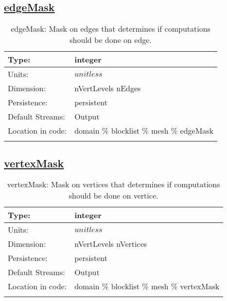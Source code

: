 \subsection[edgeMask]{\hyperref[sec:var_tab_mesh]{edgeMask}}
\label{subsec:var_sec_mesh_edgeMask}
\begin{center}
\begin{longtable}{| p{2.0in} | p{4.0in} |}
        \hline 
        Type: & integer \\
        \hline 
        Units: & $unitless$ \\
        \hline 
        Dimension: & nVertLevels nEdges \\
        \hline 
        Persistence: & persistent \\
        \hline 
		 Default Streams: & Output  \\
        \hline 
		 Location in code: & domain \% blocklist \% mesh \% edgeMask \\
		 \hline 
    \caption{edgeMask: Mask on edges that determines if computations should be done on edge.}
\end{longtable}
\end{center}
\subsection[vertexMask]{\hyperref[sec:var_tab_mesh]{vertexMask}}
\label{subsec:var_sec_mesh_vertexMask}
\begin{center}
\begin{longtable}{| p{2.0in} | p{4.0in} |}
        \hline 
        Type: & integer \\
        \hline 
        Units: & $unitless$ \\
        \hline 
        Dimension: & nVertLevels nVertices \\
        \hline 
        Persistence: & persistent \\
        \hline 
		 Default Streams: & Output  \\
        \hline 
		 Location in code: & domain \% blocklist \% mesh \% vertexMask \\
		 \hline 
    \caption{vertexMask: Mask on vertices that determines if computations should be done on vertice.}
\end{longtable}
\end{center}
